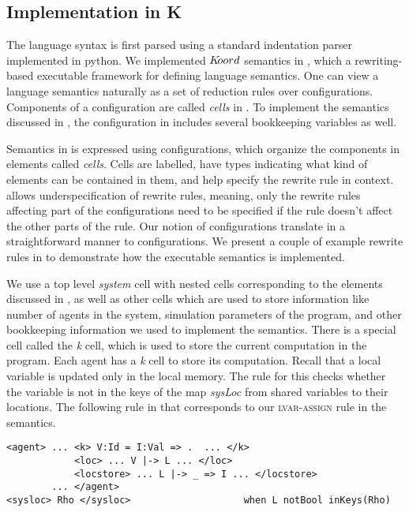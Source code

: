 \subsection{Implementation in K}

The language syntax is first parsed using a standard indentation parser implemented in python. We implemented $K\kern-2pt oord$ semantics in \K, which a rewriting-based executable framework for defining language semantics. One can view a language semantics naturally as a set of reduction rules over configurations. Components of a configuration are called {\em cells} in \K. To implement the semantics discussed in , the configuration in \K includes several bookkeeping variables as well. 


Semantics in \K is expressed using configurations, which organize the components in elements called {\em cells}. Cells are labelled, have types indicating what kind of elements can be contained in them, and help specify the rewrite rule in context. \K allows underspecification of rewrite rules, meaning, only the rewrite rules affecting part of the configurations need to be specified if the rule doesn't affect the other parts of the rule. Our notion of configurations translate in a straightforward manner to \K configurations. We present a couple of example rewrite rules in \K to demonstrate how the executable semantics is implemented.  


We use a top level {\em system} cell with nested cells corresponding to the elements discussed in , as well as other cells which are used to store information like number of agents in the system, simulation parameters of the program, and other bookkeeping information we used to implement the semantics. There is a special cell called the {\em k} cell, which is used to store the current computation in the program. Each agent has a {\em k} cell to store its computation. Recall that a local variable is updated only in the local memory. The rule for this checks whether the variable is not in the keys of the map {\em sysLoc} from shared variables to their locations. The following rule in \K that corresponds to our \textsc{lvar-assign} rule in the semantics. 
\vspace{2pt}
\begin{mdframed}
\begin{Verbatim}[fontsize=\tiny]
<agent> ... <k> V:Id = I:Val => .  ... </k> 
            <loc> ... V |-> L ... </loc> 
            <locstore> ... L |-> _ => I ... </locstore> 
        ... </agent> 
<sysloc> Rho </sysloc>                    when L notBool inKeys(Rho)        
\end{Verbatim}
\end{mdframed}

